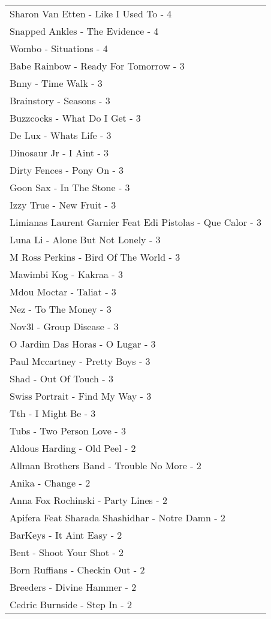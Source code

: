 \documentclass[
]{article}
\begin{document}
\begin{longtable}{l}
Sharon Van Etten - Like I Used To - 4 \\ 
Snapped Ankles - The Evidence - 4 \\ 
Wombo - Situations - 4 \\ 
Babe Rainbow - Ready For Tomorrow - 3 \\ 
Bnny - Time Walk - 3 \\ 
Brainstory - Seasons - 3 \\ 
Buzzcocks - What Do I Get - 3 \\ 
De Lux - Whats Life - 3 \\ 
Dinosaur Jr - I Aint - 3 \\ 
Dirty Fences - Pony On - 3 \\ 
Goon Sax - In The Stone - 3 \\ 
Izzy True - New Fruit - 3 \\ 
Limianas Laurent Garnier Feat Edi Pistolas - Que Calor - 3 \\ 
Luna Li - Alone But Not Lonely - 3 \\ 
M Ross Perkins - Bird Of The World - 3 \\ 
Mawimbi Kog - Kakraa - 3 \\ 
Mdou Moctar - Taliat - 3 \\ 
Nez - To The Money - 3 \\ 
Nov3l - Group Disease - 3 \\ 
O Jardim Das Horas - O Lugar - 3 \\ 
Paul Mccartney - Pretty Boys - 3 \\ 
Shad - Out Of Touch - 3 \\ 
Swiss Portrait - Find My Way - 3 \\ 
Tth - I Might Be - 3 \\ 
Tubs - Two Person Love - 3 \\ 
Aldous Harding - Old Peel - 2 \\ 
Allman Brothers Band - Trouble No More - 2 \\ 
Anika - Change - 2 \\ 
Anna Fox Rochinski - Party Lines - 2 \\ 
Apifera Feat Sharada Shashidhar - Notre Damn - 2 \\ 
BarKeys - It Aint Easy - 2 \\ 
Bent - Shoot Your Shot - 2 \\ 
Born Ruffians - Checkin Out - 2 \\ 
Breeders - Divine Hammer - 2 \\ 
Cedric Burnside - Step In - 2 \\ 

\end{longtable}
\end{document}
